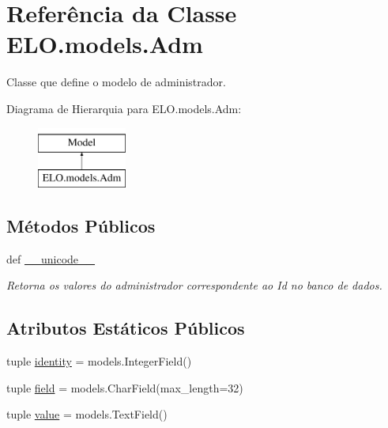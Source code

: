 \hypertarget{classELO_1_1models_1_1Adm}{\section{Referência da Classe E\-L\-O.\-models.\-Adm}
\label{classELO_1_1models_1_1Adm}
}


Classe que define o modelo de administrador.  


Diagrama de Hierarquia para E\-L\-O.\-models.\-Adm\-:\begin{figure}[H]
\begin{center}
\leavevmode
\includegraphics[height=2.000000cm]{df/d5e/classELO_1_1models_1_1Adm}
\end{center}
\end{figure}
\subsection*{Métodos Públicos}
\begin{DoxyCompactItemize}
\item 
def \hyperlink{classELO_1_1models_1_1Adm_a3541c3ae12b8d2da3f44ac6be00a23e6}{\-\_\-\-\_\-unicode\-\_\-\-\_\-}
\begin{DoxyCompactList}\small\item\em Retorna os valores do administrador correspondente ao Id no banco de dados. \end{DoxyCompactList}\end{DoxyCompactItemize}
\subsection*{Atributos Estáticos Públicos}
\begin{DoxyCompactItemize}
\item 
tuple \hyperlink{classELO_1_1models_1_1Adm_af7e7b797ce5d3396e8a54d8927450d75}{identity} = models.\-Integer\-Field()
\item 
tuple \hyperlink{classELO_1_1models_1_1Adm_ae1af4ca22491b1cfe9cb0a7acefaa71e}{field} = models.\-Char\-Field(max\-\_\-length=32)
\item 
tuple \hyperlink{classELO_1_1models_1_1Adm_a98f249c493fbcbcd347297437a098212}{value} = models.\-Text\-Field()
\end{DoxyCompactItemize}


